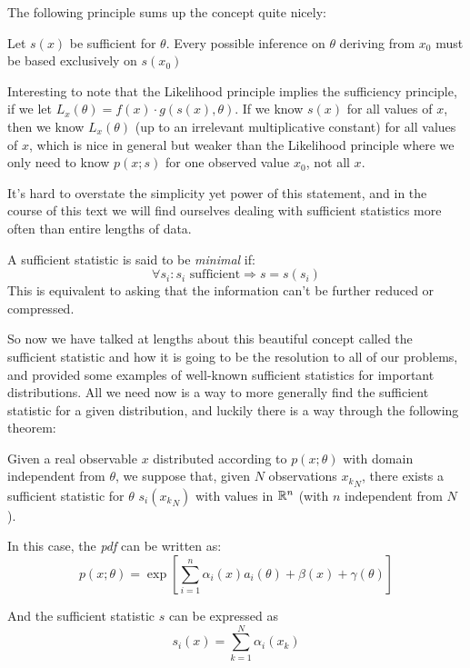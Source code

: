 The following principle sums up the concept quite nicely:

\begin{theorem}
	Let $s(x)$ be sufficient for $\theta$. Every possible inference on $\theta$ deriving from $x_0$ must be based exclusively on $s(x_0)$
\end{theorem}

Interesting to note that the Likelihood principle implies the sufficiency principle, if we let $L_x(\theta)=f(x)\cdot g(s(x),\theta)$. If we know $s(x)$ for all values of $x$, then we know $L_x(\theta)$ (up to an irrelevant multiplicative constant) for all values of $x$, which is nice in general but weaker than the Likelihood principle where we only need to know $p(x;s)$ for one observed value $x_0$, not all $x$. 

 It's hard to overstate the simplicity yet power of this statement, and in the course of this text we will find ourselves dealing with sufficient statistics more often than entire lengths of data. 

\begin{definition}
	A sufficient statistic is said to be \emph{minimal} if:
	\[
	\forall s_i:s_i\text{ sufficient}\Rightarrow s=s(s_i)
	\]
	This is equivalent to asking that the information can't be further reduced or compressed. 
\end{definition}


So now we have talked at lengths about this beautiful concept called the sufficient statistic and how it is going to be the resolution to all of our problems, and provided some examples of well-known sufficient statistics for important distributions. All we need now is a way to more generally find the sufficient statistic for a given distribution, and luckily there is a way through the following theorem:

\begin{theorem}
	Given a real observable $x$ distributed according to $p(x;\theta)$ with domain independent from $\theta$, we suppose that, given $N$ observations ${x_k}_N$, there exists a sufficient statistic for $\theta$ $s_i\left({x_k}_N\right)$ with values in $\mathbb{R}^n$ (with $n$ independent from $N$).
	
	In this case, the \emph{pdf} can be written as:
	\[
	p(x;\theta) = \exp{\left[ \sum_{i=1}^n \alpha_i(x)a_i(\theta) + \beta(x) +\gamma(\theta)\right]}
	\]
	
	And the sufficient statistic $s$ can be expressed as
	\[
	s_i(x)=\sum_{k=1}^N \alpha_i(x_k)
	\]
\label{th:darmois}
\end{theorem}

